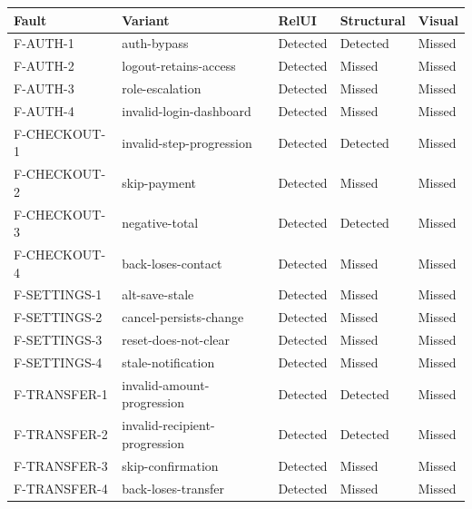 \begin{tabular}{lllll}
\toprule
Fault & Variant & RelUI & Structural & Visual \\
\midrule
F-AUTH-1 & auth-bypass & Detected & Detected & Missed \\
F-AUTH-2 & logout-retains-access & Detected & Missed & Missed \\
F-AUTH-3 & role-escalation & Detected & Missed & Missed \\
F-AUTH-4 & invalid-login-dashboard & Detected & Missed & Missed \\
F-CHECKOUT-1 & invalid-step-progression & Detected & Detected & Missed \\
F-CHECKOUT-2 & skip-payment & Detected & Missed & Missed \\
F-CHECKOUT-3 & negative-total & Detected & Detected & Missed \\
F-CHECKOUT-4 & back-loses-contact & Detected & Missed & Missed \\
F-SETTINGS-1 & alt-save-stale & Detected & Missed & Missed \\
F-SETTINGS-2 & cancel-persists-change & Detected & Missed & Missed \\
F-SETTINGS-3 & reset-does-not-clear & Detected & Missed & Missed \\
F-SETTINGS-4 & stale-notification & Detected & Missed & Missed \\
F-TRANSFER-1 & invalid-amount-progression & Detected & Detected & Missed \\
F-TRANSFER-2 & invalid-recipient-progression & Detected & Detected & Missed \\
F-TRANSFER-3 & skip-confirmation & Detected & Missed & Missed \\
F-TRANSFER-4 & back-loses-transfer & Detected & Missed & Missed \\
\bottomrule
\end{tabular}
